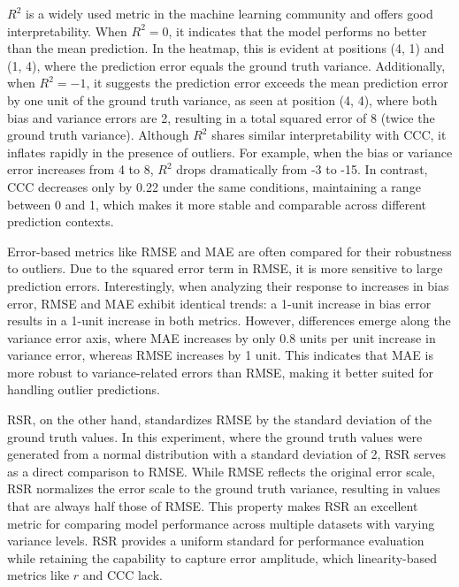 $R^2$ is a widely used metric in the machine learning community and offers good interpretability. When $R^2 = 0$, it indicates that the model performs no better than the mean prediction. In the heatmap, this is evident at positions (4, 1) and (1, 4), where the prediction error equals the ground truth variance. Additionally, when $R^2 = -1$, it suggests the prediction error exceeds the mean prediction error by one unit of the ground truth variance, as seen at position (4, 4), where both bias and variance errors are 2, resulting in a total squared error of 8 (twice the ground truth variance). Although $R^2$ shares similar interpretability with CCC, it inflates rapidly in the presence of outliers. For example, when the bias or variance error increases from 4 to 8, $R^2$ drops dramatically from -3 to -15. In contrast, CCC decreases only by 0.22 under the same conditions, maintaining a range between 0 and 1, which makes it more stable and comparable across different prediction contexts.

Error-based metrics like RMSE and MAE are often compared for their robustness to outliers. Due to the squared error term in RMSE, it is more sensitive to large prediction errors. Interestingly, when analyzing their response to increases in bias error, RMSE and MAE exhibit identical trends: a 1-unit increase in bias error results in a 1-unit increase in both metrics. However, differences emerge along the variance error axis, where MAE increases by only 0.8 units per unit increase in variance error, whereas RMSE increases by 1 unit. This indicates that MAE is more robust to variance-related errors than RMSE, making it better suited for handling outlier predictions.

RSR, on the other hand, standardizes RMSE by the standard deviation of the ground truth values. In this experiment, where the ground truth values were generated from a normal distribution with a standard deviation of 2, RSR serves as a direct comparison to RMSE. While RMSE reflects the original error scale, RSR normalizes the error scale to the ground truth variance, resulting in values that are always half those of RMSE. This property makes RSR an excellent metric for comparing model performance across multiple datasets with varying variance levels. RSR provides a uniform standard for performance evaluation while retaining the capability to capture error amplitude, which linearity-based metrics like $r$ and CCC lack.


